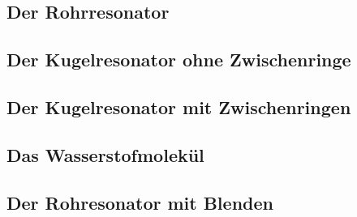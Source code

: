 \documentclass[../main.tex]{subfiles}
\begin{document}
    
\subsection{Der Rohrresonator}

\subsection{Der Kugelresonator ohne Zwischenringe}     

\subsection{Der Kugelresonator mit Zwischenringen}        

\subsection{Das Wasserstofmolekül}

\subsection{Der Rohresonator mit Blenden}
\end{document}
